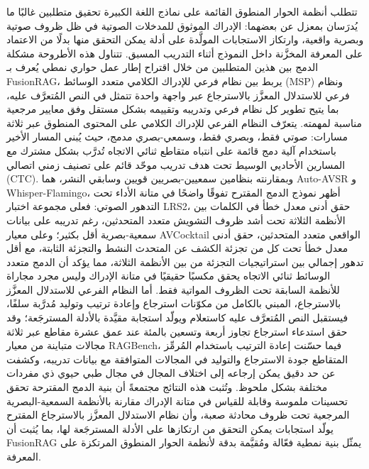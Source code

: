 \documentclass[12pt,a4paper,oneside]{report}
\begin{document}
\noindent
تتطلب أنظمة الحوار المنطوق القائمة على نماذج اللغة الكبيرة تحقيق متطلبين غالبًا ما يُدرَسان
بمعزل عن بعضهما: الإدراك الموثوق للمدخلات الصوتية في ظل ظروف صوتية وبصرية واقعية، وارتكاز
الاستجابات المولَّدة على أدلة يمكن التحقق منها بدلًا من الاعتماد على المعرفة المخزَّنة داخل
النموذج أثناء التدريب المسبق. تتناول هذه الأطروحة مشكلة الدمج بين هذين المتطلبين من خلال
اقتراح إطار عمل حواري نمطي يُعرف بـ FusionRAG، يربط بين نظام فرعي للإدراك الكلامي متعدد
الوسائط (MSP) ونظام فرعي للاستدلال المعزَّز بالاسترجاع عبر واجهة واحدة تتمثل في النص
المُتعرَّف عليه، بما يتيح تطوير كل نظام فرعي وتدريبه وتقييمه بشكل مستقل وفق معايير مرجعية
مناسبة لمهمته. يتعرّف النظام الفرعي للإدراك الكلامي على المحتوى المنطوق عبر ثلاثة مسارات:
صوتي فقط، وبصري فقط، وسمعي-بصري مدمج، حيث يُبنى المسار الأخير باستخدام آلية دمج قائمة على
انتباه متقاطع ثنائي الاتجاه تُدرَّب بشكل مشترك مع المسارين الأحاديي الوسيط تحت هدف تدريب
موحّد قائم على تصنيف زمني اتصالي (CTC). وبمقارنته بنظامين سمعيين-بصريين قويين وسابقي النشر،
هما Auto-AVSR و Whisper-Flamingo، أظهر نموذج الدمج المقترح تفوقًا واضحًا في متانة الأداء
تحت التدهور الصوتي: فعلى مجموعة اختبار LRS2، حقق أدنى معدل خطأ في الكلمات بين الأنظمة
الثلاثة تحت أشد ظروف التشويش متعدد المتحدثين، رغم تدريبه على بيانات سمعية-بصرية أقل بكثير؛
وعلى معيار AVCocktail الواقعي متعدد المتحدثين، حقق أدنى معدل خطأ تحت كل من تجزئة الكشف عن
المتحدث النشط والتجزئة الثابتة، مع أقل تدهور إجمالي بين استراتيجيات التجزئة من بين الأنظمة
الثلاثة، مما يؤكد أن الدمج متعدد الوسائط ثنائي الاتجاه يحقق مكسبًا حقيقيًا في متانة
الإدراك وليس مجرد مجاراة للأنظمة السابقة تحت الظروف المواتية فقط. أما النظام الفرعي
للاستدلال المعزَّز بالاسترجاع، المبني بالكامل من مكوّنات استرجاع وإعادة ترتيب وتوليد
مُدرَّبة سلفًا، فيستقبل النص المُتعرَّف عليه كاستعلام ويولّد استجابة مقيَّدة بالأدلة
المسترجَعة؛ وقد حقق استدعاء استرجاع تجاوز أربعة وتسعين بالمئة عند عمق عشرة مقاطع عبر ثلاثة
مجالات متباينة من معيار RAGBench، فيما حسّنت إعادة الترتيب باستخدام المُرمِّز المتقاطع جودة
الاسترجاع والتوليد في المجالات المتوافقة مع بيانات تدريبه، وكشفت عن حد دقيق يمكن إرجاعه
إلى اختلاف المجال في مجال طبي حيوي ذي مفردات مختلفة بشكل ملحوظ. وتُثبت هذه النتائج مجتمعةً
أن بنية الدمج المقترحة تحقق تحسينات ملموسة وقابلة للقياس في متانة الإدراك مقارنة بالأنظمة
السمعية-البصرية المرجعية تحت ظروف محادثة صعبة، وأن نظام الاستدلال المعزَّز بالاسترجاع
المقترح يولّد استجابات يمكن التحقق من ارتكازها على الأدلة المسترجَعة لها، بما يُثبت أن
FusionRAG يمثّل بنية نمطية فعّالة ومُقيَّمة بدقة لأنظمة الحوار المنطوق المرتكزة على
المعرفة.
\end{document}
